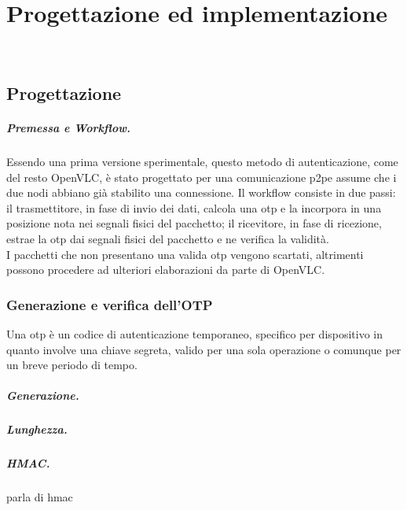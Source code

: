 \chapter{Progettazione ed implementazione}
\label{cap:progettazione}

\\

\section{Progettazione}

\paragraph{Premessa e Workflow.}
Essendo una prima versione sperimentale, questo metodo di autenticazione, come del resto OpenVLC, è stato progettato per una comunicazione \gls{p2p}\glsfirstoccur e assume che i due nodi abbiano già stabilito una connessione.
Il workflow consiste in due passi: il trasmettitore, in fase di invio dei dati, calcola una \gls{otp} e la incorpora in una posizione nota nei segnali fisici del pacchetto; il ricevitore, in fase di ricezione, estrae la \gls{otp} dai segnali fisici del pacchetto e ne verifica la validità.\\
I pacchetti che non presentano una valida \gls{otp} vengono scartati, altrimenti possono procedere ad ulteriori elaborazioni da parte di OpenVLC.


\subsection{Generazione e verifica dell'OTP}
Una \gls{otp} è un codice di autenticazione temporaneo, specifico per dispositivo in quanto involve una chiave segreta, valido per una sola operazione o comunque per un breve periodo di tempo.

\paragraph{Generazione.}
\paragraph{Lunghezza.}
\paragraph{HMAC.}
parla di \gls{hmac} 
